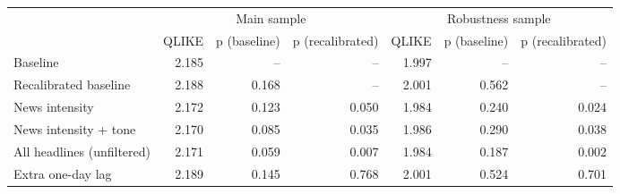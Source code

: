 \begin{tabular}{lrrrrrr}
\toprule
 & \multicolumn{3}{c}{Main sample} & \multicolumn{3}{c}{Robustness sample} \\
 & QLIKE & p (baseline) & p (recalibrated) & QLIKE & p (baseline) & p (recalibrated) \\
\midrule
Baseline & 2.185 & -- & -- & 1.997 & -- & -- \\
Recalibrated baseline & 2.188 & 0.168 & -- & 2.001 & 0.562 & -- \\
News intensity & 2.172 & 0.123 & 0.050 & 1.984 & 0.240 & 0.024 \\
News intensity + tone & 2.170 & 0.085 & 0.035 & 1.986 & 0.290 & 0.038 \\
All headlines (unfiltered) & 2.171 & 0.059 & 0.007 & 1.984 & 0.187 & 0.002 \\
Extra one-day lag & 2.189 & 0.145 & 0.768 & 2.001 & 0.524 & 0.701 \\
\bottomrule
\end{tabular}
